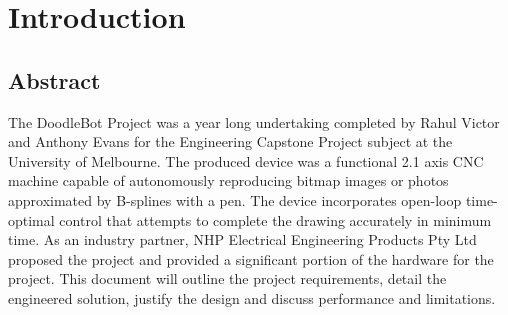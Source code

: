 
\chapter{Introduction}





\section{Abstract}
The DoodleBot Project was a year long undertaking completed by Rahul Victor and Anthony Evans for the  Engineering Capstone Project subject at the University of Melbourne. The produced device was a functional 2.1 axis CNC machine capable of autonomously reproducing bitmap images or photos approximated by B-splines with a pen. The device incorporates open-loop time-optimal control that attempts to complete the drawing accurately in minimum time. As an industry partner, NHP Electrical Engineering Products Pty Ltd proposed the project and provided a significant portion of the hardware for the project. This document will outline the project requirements, detail the engineered solution, justify the design and discuss performance and limitations. 

